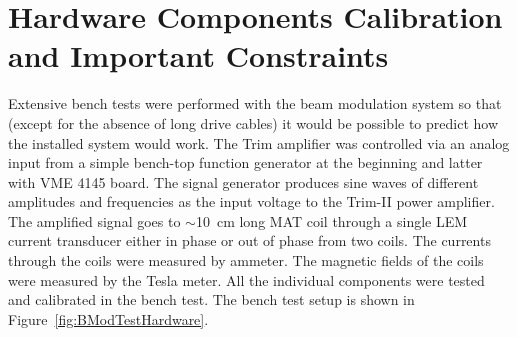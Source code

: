 \section{Hardware Components Calibration and Important Constraints}
\label{Hardware Components Calibration and Important Constraints}
Extensive bench tests were performed with the beam modulation system so that (except for the absence of long drive cables) it would be possible to predict how the installed system would work. The Trim amplifier was controlled via an analog input from a simple bench-top function generator at the beginning and latter with VME 4145 board. 
The signal generator produces sine waves of different amplitudes and frequencies as the input voltage to the Trim-II power amplifier. The amplified signal goes to $\sim$10~cm long MAT coil through a single LEM current transducer either in phase or out of phase from two coils. The currents through the coils were measured by ammeter. The magnetic fields of the coils were measured by the Tesla meter. All the individual components were tested and calibrated in the bench test. The bench test setup is shown in Figure~\ref{fig:BModTestHardware}.

